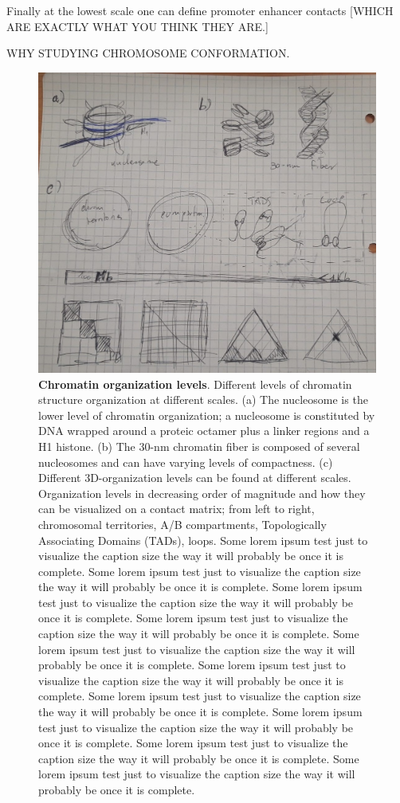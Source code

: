 Finally at the lowest scale one can define promoter enhancer contacts [WHICH ARE EXACTLY WHAT YOU THINK THEY ARE.]

WHY STUDYING CHROMOSOME CONFORMATION.

\begin{figure}
  \centering
  \includegraphics[width=1\textwidth]{chromatin_organization.jpeg}
  \caption{\textbf{Chromatin organization levels}. Different levels of chromatin structure organization at different scales. (a) The nucleosome is the lower level of chromatin organization; a nucleosome is constituted by DNA wrapped around a proteic octamer plus a linker regions and a H1 histone. (b) The 30-nm chromatin fiber is composed of several nucleosomes and can have varying levels of compactness. (c) Different 3D-organization levels can be found at different scales. Organization levels in decreasing order of magnitude and how they can be visualized on a contact matrix; from left to right, chromosomal territories, A/B compartments, Topologically Associating Domains (TADs), loops. Some lorem ipsum test just to visualize the caption size the way it will probably be once it is complete. Some lorem ipsum test just to visualize the caption size the way it will probably be once it is complete. Some lorem ipsum test just to visualize the caption size the way it will probably be once it is complete. Some lorem ipsum test just to visualize the caption size the way it will probably be once it is complete. Some lorem ipsum test just to visualize the caption size the way it will probably be once it is complete. Some lorem ipsum test just to visualize the caption size the way it will probably be once it is complete. Some lorem ipsum test just to visualize the caption size the way it will probably be once it is complete. Some lorem ipsum test just to visualize the caption size the way it will probably be once it is complete. Some lorem ipsum test just to visualize the caption size the way it will probably be once it is complete. Some lorem ipsum test just to visualize the caption size the way it will probably be once it is complete.}
  \label{fig:chromatin}
\end{figure}

